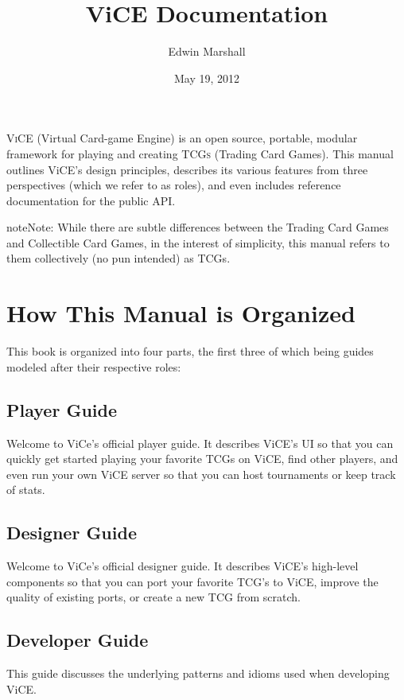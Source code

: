 \documentclass[letterpaper,10pt,english]{sphinxmanual}
\title{ViCE Documentation}
\date{May 19, 2012}
\author{Edwin Marshall}
\begin{document}
\maketitle
\tableofcontents
{}\label{index::doc}


\textsc{ViCE} (Virtual Card-game Engine) is an open source, portable, modular
framework for playing and creating \textsc{TCGs} (Trading Card Games). This
manual outlines ViCE's design principles, describes its various features from
three perspectives (which we refer to as roles), and even includes reference
documentation for the public API.

\begin{notice}{note}{Note:}
While there are subtle differences between the Trading Card Games and
Collectible Card Games, in the interest of simplicity, this manual refers
to them collectively (no pun intended) as TCGs.
\end{notice}


\part{How This Manual is Organized}
\label{index:introduction}\label{index:how-this-manual-is-organized}
This book is organized into four parts, the first three of which being guides
modeled after their respective roles:


\chapter{Player Guide}
\label{player_guide/player_index:player-guide}\label{player_guide/player_index::doc}
Welcome to ViCe's official player guide. It describes ViCE's UI so that you
can quickly get started playing your favorite TCGs on ViCE, find other
players, and even run your own ViCE server so that you can host tournaments
or keep track of stats.


\chapter{Designer Guide}
\label{designer_guide/designer_index:designer-guide}\label{designer_guide/designer_index::doc}
Welcome to ViCe's official designer guide. It describes ViCE's high-level
components so that you can port your favorite TCG's to ViCE, improve
the quality of existing ports, or create a new TCG from scratch.


\chapter{Developer Guide}
\label{developer_guide/developer_index::doc}\label{developer_guide/developer_index:developer-guide}
This guide discusses the underlying patterns and idioms used when developing
ViCE.
\end{document}
